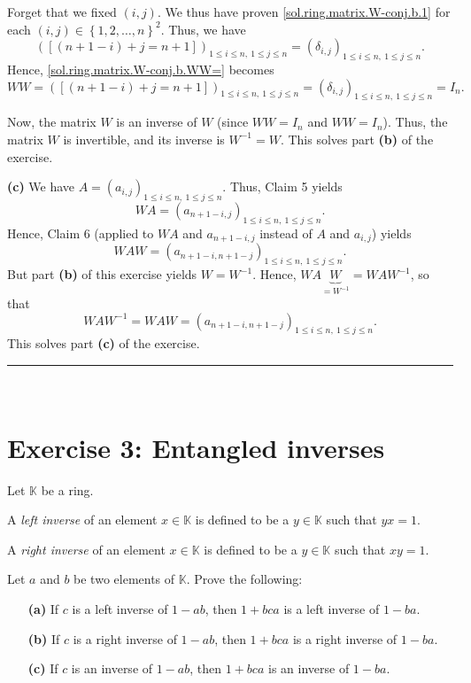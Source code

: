 \documentclass[paper=a4, fontsize=12pt]{scrartcl}%
\theoremstyle{plainsl}
\theoremstyle{definition}
\theoremstyle{remark}
\begin{document}
Forget that we fixed $\left(  i,j\right)  $. We thus have proven
\eqref{sol.ring.matrix.W-conj.b.1} for each $\left(  i,j\right)  \in\left\{
1,2,\ldots,n\right\}  ^{2}$. Thus, we have%
\[
\left(  \left[  \left(  n+1-i\right)  +j=n+1\right]  \right)  _{1\leq i\leq
n,\ 1\leq j\leq n}=\left(  \delta_{i,j}\right)  _{1\leq i\leq n,\ 1\leq j\leq
n}.
\]
Hence, \eqref{sol.ring.matrix.W-conj.b.WW=} becomes%
\[
WW=\left(  \left[  \left(  n+1-i\right)  +j=n+1\right]  \right)  _{1\leq i\leq
n,\ 1\leq j\leq n}=\left(  \delta_{i,j}\right)  _{1\leq i\leq n,\ 1\leq j\leq
n}=I_{n}.
\]


Now, the matrix $W$ is an inverse of $W$ (since $WW=I_{n}$ and $WW=I_{n}$).
Thus, the matrix $W$ is invertible, and its inverse is $W^{-1}=W$. This solves
part \textbf{(b)} of the exercise.

\bigskip

\textbf{(c)} We have $A=\left(  a_{i,j}\right)  _{1\leq i\leq n,\ 1\leq j\leq
n}$. Thus, Claim 5 yields%
\[
WA=\left(  a_{n+1-i,j}\right)  _{1\leq i\leq n,\ 1\leq j\leq n}.
\]
Hence, Claim 6 (applied to $WA$ and $a_{n+1-i,j}$ instead of $A$ and $a_{i,j}%
$) yields%
\[
WAW=\left(  a_{n+1-i,n+1-j}\right)  _{1\leq i\leq n,\ 1\leq j\leq n}.
\]
But part \textbf{(b)} of this exercise yields $W=W^{-1}$. Hence,
$WA\underbrace{W}_{=W^{-1}}=WAW^{-1}$, so that
\[
WAW^{-1}=WAW=\left(  a_{n+1-i,n+1-j}\right)  _{1\leq i\leq n,\ 1\leq j\leq
n}.
\]
This solves part \textbf{(c)} of the exercise.

\rule{\linewidth}{0.3pt} \\[0.4cm]

\section{Exercise 3: Entangled inverses}

Let $\mathbb{K}$ be a ring.

A \textit{left inverse} of an element $x \in\mathbb{K}$ is defined to be a $y
\in\mathbb{K}$ such that $yx = 1$.

A \textit{right inverse} of an element $x \in\mathbb{K}$ is defined to be a $y
\in\mathbb{K}$ such that $xy = 1$.

Let $a$ and $b$ be two elements of $\mathbb{K}$. Prove the following:

\begin{enumerate}
\item[\textbf{(a)}] If $c$ is a left inverse of $1 - ab$, then $1 + bca$ is a
left inverse of $1 - ba$.

\item[\textbf{(b)}] If $c$ is a right inverse of $1 - ab$, then $1 + bca$ is a
right inverse of $1 - ba$.

\item[\textbf{(c)}] If $c$ is an inverse of $1 - ab$, then $1 + bca$ is an
inverse of $1 - ba$.
\end{enumerate}
\end{document}
